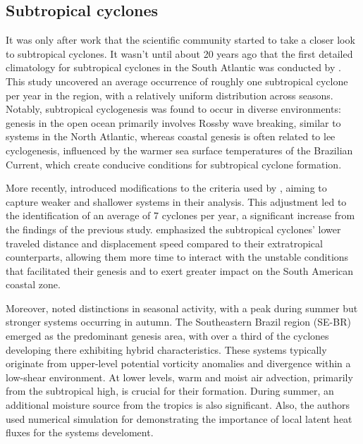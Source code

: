 \subsection{Subtropical cyclones}

It was only after \citet{hart2003cyclone} work that the scientific community started to take a closer look to subtropical cyclones.  It wasn't until about 20 years ago that the first detailed climatology for subtropical cyclones in the South Atlantic was conducted by \citet{evans2003objective}. This study uncovered an average occurrence of roughly one subtropical cyclone per year in the region, with a relatively uniform distribution across seasons. Notably, subtropical cyclogenesis was found to occur in diverse environments: genesis in the open ocean primarily involves Rossby wave breaking, similar to systems in the North Atlantic, whereas coastal genesis is often related to lee cyclogenesis, influenced by the warmer sea surface temperatures of the Brazilian Current, which create conducive conditions for subtropical cyclone formation.

More recently, \citet{gozzo2014subtropical} introduced modifications to the criteria used by \citet{evans2003objective}, aiming to capture weaker and shallower systems in their analysis. This adjustment led to the identification of an average of 7 cyclones per year, a significant increase from the findings of the previous study. \citet{gozzo2014subtropical} emphasized the subtropical cyclones' lower traveled distance and displacement speed compared to their extratropical counterparts, allowing them more time to interact with the unstable conditions that facilitated their genesis and to exert greater impact on the South American coastal zone.

Moreover, \citet{gozzo2014subtropical} noted distinctions in seasonal activity, with a peak during summer but stronger systems occurring in autumn. The Southeastern Brazil region (SE-BR) emerged as the predominant genesis area, with over a third of the cyclones developing there exhibiting hybrid characteristics. These systems typically originate from upper-level potential vorticity anomalies and divergence within a low-shear environment. At lower levels, warm and moist air advection, primarily from the subtropical high, is crucial for their formation. During summer, an additional moisture source from the tropics is also significant. Also, the authors used numerical simulation for demonstrating the importance of local latent heat fluxes for the systems develoment.

